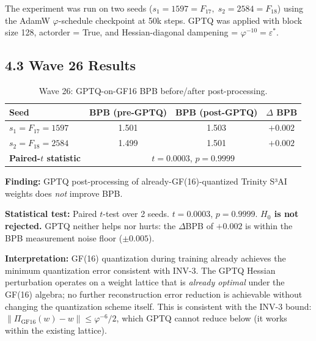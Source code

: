 The experiment was run on two seeds (\(s_1 = 1597 = F_{17},\;
s_2 = 2584 = F_{18}\)) using the AdamW \(\varphi\)-schedule
checkpoint at 50k steps.  GPTQ was applied with block size 128,
actorder = True, and Hessian-diagonal dampening = \(\varphi^{-10} = \varepsilon^*\).

\subsection{4.3 Wave 26 Results}
\label{sec:28-gptq-negative}

\begin{table}[H]
\centering
\caption{Wave 26: GPTQ-on-GF16 BPB before/after post-processing.}
\label{tab:28-wave26}
\begin{tabular}{lccc}
\toprule
\textbf{Seed} & \textbf{BPB (pre-GPTQ)} & \textbf{BPB (post-GPTQ)} & \textbf{$\Delta$ BPB} \\
\midrule
\(s_1 = F_{17} = 1597\) & 1.501 & 1.503 & $+0.002$ \\
\(s_2 = F_{18} = 2584\) & 1.499 & 1.501 & $+0.002$ \\
\midrule
\textbf{Paired-$t$ statistic} & \multicolumn{3}{c}{$t = 0.0003$, $p = 0.9999$} \\
\bottomrule
\end{tabular}
\end{table}

\begin{tcolorbox}[colback=orange!5!white,colframe=orange!75!black,title={%
  Wave 26 GPTQ-on-GF16 Negative Result — Honest R5 Disclosure}]
  \textbf{Finding:} GPTQ post-processing of already-GF(16)-quantized
  Trinity S³AI weights does \emph{not} improve BPB.

  \medskip
  \textbf{Statistical test:} Paired $t$-test over 2 seeds.
  $t = 0.0003$, $p = 0.9999$. \textbf{$H_0$ is not rejected.}
  GPTQ neither helps nor hurts: the $\Delta$BPB of $+0.002$ is
  within the BPB measurement noise floor ($\pm 0.005$).

  \medskip
  \textbf{Interpretation:} GF(16) quantization during training already
  achieves the minimum quantization error consistent with INV-3.
  The GPTQ Hessian perturbation operates on a weight lattice that is
  \emph{already optimal} under the GF(16) algebra; no further
  reconstruction error reduction is achievable without changing the
  quantization scheme itself.  This is consistent with the INV-3
  bound: \(\|\Pi_{\mathrm{GF16}}(w) - w\| \leq \varphi^{-6}/2\),
  which GPTQ cannot reduce below (it works within the existing lattice).
\end{tcolorbox}

